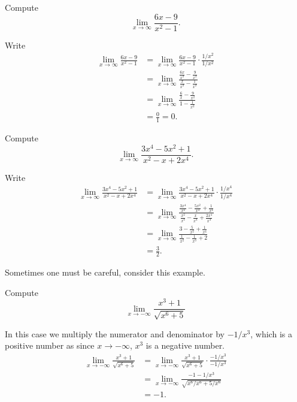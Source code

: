 \documentclass{ximera}
\begin{document}
\begin{example} Compute
\[
\lim_{x\to\infty} \frac{6x-9}{x^2-1}.
\]
\begin{explanation}
Write
\begin{align*}
\lim_{x\to\infty}\frac{6x-9}{x^2-1} &= \lim_{x\to\infty}\frac{6x-9}{x^2-1}\cdot \frac{1/x^2}{1/x^2}\\
&=\lim_{x\to\infty}\frac{\frac{6x}{x^2} - \frac{9}{x^2}}{\frac{x}{x^2} - \frac{1}{x^2}}\\
&= \lim_{x\to\infty} \frac{\frac{6}{x}-\frac{9}{x^2}}{1-\frac{1}{x^2}}\\
&= \frac{0}{1}=0.
\end{align*}
\end{explanation}
\end{example}

\begin{example} Compute
\[
\lim_{x\to\infty} \frac{3x^4-5x^2+1}{x^2-x+2x^4}.
\]
\begin{explanation}
Write
\begin{align*}
\lim_{x\to\infty}\frac{3x^4-5x^2+1}{x^2-x+2x^4} &= \lim_{x\to\infty}\frac{3x^4-5x^2+1}{x^2-x+2x^4}\cdot \frac{1/x^4}{1/x^4}\\
&=\lim_{x\to\infty}\frac{\frac{3x^4}{x^4} - \frac{5x^2}{x^4}+\frac{1}{x^4}}{\frac{x^2}{x^4}-\frac{x}{x^4} + \frac{2x^4}{x^4}}\\
&= \lim_{x\to\infty} \frac{3-\frac{5}{x^2}+\frac{1}{x^4}}{\frac{1}{x^2}-\frac{1}{x^3}+2}\\
&= \frac{3}{2}.
\end{align*}
\end{explanation}
\end{example}

Sometimes one must be careful, consider this example.

\begin{example}
Compute
\[
\lim_{x\to -\infty} \frac{x^3+1}{\sqrt{x^6+5}}
\]
\begin{explanation}
In this case we multiply the numerator and denominator by $-1/x^3$,
which is a positive number as since $x\to -\infty$, $x^3$ is a negative
number.
\begin{align*}
\lim_{x\to -\infty} \frac{x^3+1}{\sqrt{x^6+5}} &= \lim_{x\to -\infty} \frac{x^3+1}{\sqrt{x^6+5}} \cdot \frac{-1/x^3}{-1/x^3}\\
&= \lim_{x\to -\infty} \frac{-1-1/x^3}{\sqrt{x^6/x^6+5/x^6}}\\
&= -1.
\end{align*}
\end{explanation}
\end{example}
\end{document}
